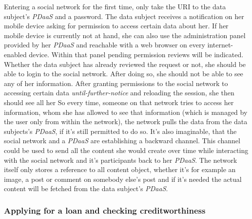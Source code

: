 \documentclass[12pt,english,a4paper,titlepage,cleardoublepage=empty,dottedtoc]{report}
\begin{document}
Entering a social network for the first time, only take the URI to the
data subject's \emph{PDaaS} and a password. The data subject receives a
notification on her mobile device asking for permission to access
certain data about her. If her mobile device is currently not at hand,
she can also use the administration panel provided by her \emph{PDaaS}
and reachable with a web browser on every internet-enabled device.
Within that panel pending permission reviews will be indicated. Whether
the data subject has already reviewed the request or not, she should be
able to login to the social network. After doing so, she should not be
able to see any of her information. After granting permissions to the
social network to accessing certain data \emph{until-further-notice} and
reloading the session, she then should see all her So every time,
someone on that network tries to access her information, whom she has
allowed to see that information (which is managed by the user only from
within the network), the network pulls the data from the data subjects's
\emph{PDaaS}, if it's still permitted to do so. It's also imaginable,
that the social network and a \emph{PDaaS} are establishing a backward
channel. This channel could be used to send all the content she would
create over time while interacting with the social network and it's
participants back to her \emph{PDaaS}. The network itself only stores a
reference to all content object, whether it's for example an image, a
post or comment on somebody else's post and if it's needed the actual
content will be fetched from the data subject's \emph{PDaaS}.

\subsubsection{Applying for a loan and checking
creditworthiness}\label{applying-for-a-loan-and-checking-creditworthiness}
\end{document}
